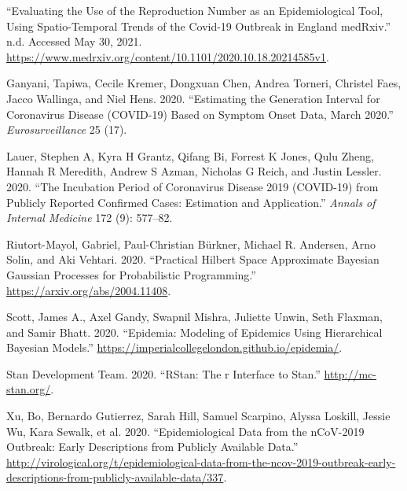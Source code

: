 \leavevmode{}%
{``Evaluating the Use of the Reproduction Number as an Epidemiological Tool, Using Spatio-Temporal Trends of the {Covid-19} Outbreak in {England} \textbar{} {medRxiv}.''} n.d. Accessed May 30, 2021. \url{https://www.medrxiv.org/content/10.1101/2020.10.18.20214585v1}.

\leavevmode{}%
Ganyani, Tapiwa, Cecile Kremer, Dongxuan Chen, Andrea Torneri, Christel Faes, Jacco Wallinga, and Niel Hens. 2020. {``Estimating the Generation Interval for Coronavirus Disease (COVID-19) Based on Symptom Onset Data, March 2020.''} \emph{Eurosurveillance} 25 (17).

\leavevmode{}%
Lauer, Stephen A, Kyra H Grantz, Qifang Bi, Forrest K Jones, Qulu Zheng, Hannah R Meredith, Andrew S Azman, Nicholas G Reich, and Justin Lessler. 2020. {``The Incubation Period of Coronavirus Disease 2019 (COVID-19) from Publicly Reported Confirmed Cases: Estimation and Application.''} \emph{Annals of Internal Medicine} 172 (9): 577--82.

\leavevmode{}%
Riutort-Mayol, Gabriel, Paul-Christian Bürkner, Michael R. Andersen, Arno Solin, and Aki Vehtari. 2020. {``Practical Hilbert Space Approximate Bayesian Gaussian Processes for Probabilistic Programming.''} \url{https://arxiv.org/abs/2004.11408}.

\leavevmode{}%
Scott, James A., Axel Gandy, Swapnil Mishra, Juliette Unwin, Seth Flaxman, and Samir Bhatt. 2020. {``Epidemia: Modeling of Epidemics Using Hierarchical Bayesian Models.''} \url{https://imperialcollegelondon.github.io/epidemia/}.

\leavevmode{}%
Stan Development Team. 2020. {``RStan: The r Interface to Stan.''} \url{http://mc-stan.org/}.

\leavevmode{}%
Xu, Bo, Bernardo Gutierrez, Sarah Hill, Samuel Scarpino, Alyssa Loskill, Jessie Wu, Kara Sewalk, et al. 2020. {``Epidemiological Data from the nCoV-2019 Outbreak: Early Descriptions from Publicly Available Data.''} \url{http://virological.org/t/epidemiological-data-from-the-ncov-2019-outbreak-early-descriptions-from-publicly-available-data/337}.

% 
% 
